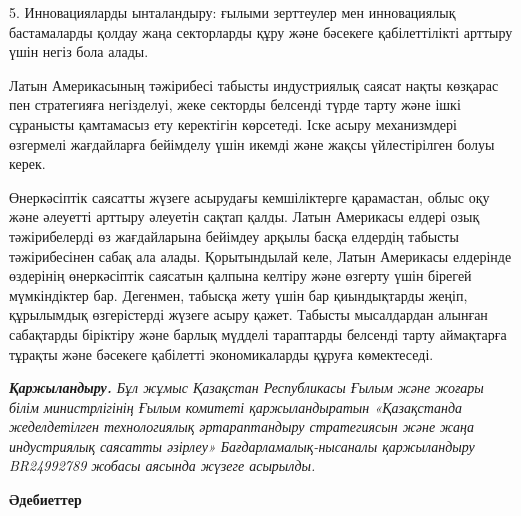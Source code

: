 \begin{multicols}{2}
5. Инновацияларды ынталандыру: ғылыми зерттеулер мен инновациялық
бастамаларды қолдау жаңа секторларды құру және бәсекеге қабілеттілікті
арттыру үшін негіз бола алады.

Латын Америкасының тәжірибесі табысты индустриялық саясат нақты көзқарас
пен стратегияға негізделуі, жеке секторды белсенді түрде тарту және ішкі
сұранысты қамтамасыз ету керектігін көрсетеді. Іске асыру механизмдері
өзгермелі жағдайларға бейімделу үшін икемді және жақсы үйлестірілген
болуы керек.

Өнеркәсіптік саясатты жүзеге асырудағы кемшіліктерге қарамастан, облыс
оқу және әлеуетті арттыру әлеуетін сақтап қалды. Латын Америкасы елдері
озық тәжірибелерді өз жағдайларына бейімдеу арқылы басқа елдердің
табысты тәжірибесінен сабақ ала алады. Қорытындылай келе, Латын
Америкасы елдерінде өздерінің өнеркәсіптік саясатын қалпына келтіру және
өзгерту үшін бірегей мүмкіндіктер бар. Дегенмен, табысқа жету үшін бар
қиындықтарды жеңіп, құрылымдық өзгерістерді жүзеге асыру қажет. Табысты
мысалдардан алынған сабақтарды біріктіру және барлық мүдделі тараптарды
белсенді тарту аймақтарға тұрақты және бәсекеге қабілетті экономикаларды
құруға көмектеседі.

\emph{{\bfseries Қаржыландыру.} Бұл жұмыс Қазақстан Республикасы Ғылым және
жоғары білім министрлігінің Ғылым комитеті қаржыландыратын «Қазақстанда
жеделдетілген технологиялық әртараптандыру стратегиясын және жаңа
индустриялық саясатты әзірлеу» Бағдарламалық-нысаналы қаржыландыру
BR24992789 жобасы аясында жүзеге асырылды.}
\end{multicols}

\begin{center}
{\bfseries Әдебиеттер}
\end{center}

